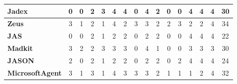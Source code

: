 \begin{table}[htb!]
\begin{tabular}{|l|l|l|l|l|l|l|l|l|l|l|l|l|l|l|l|}
\hline
\textbf{Jadex} & \multicolumn{1}{c|}{0} & \multicolumn{1}{c|}{0} & \multicolumn{1}{c|}{2} & \multicolumn{1}{c|}{3} & \multicolumn{1}{c|}{4} & \multicolumn{1}{c|}{4} & \multicolumn{1}{c|}{0} & \multicolumn{1}{c|}{4} & \multicolumn{1}{c|}{2} & \multicolumn{1}{c|}{0} & \multicolumn{1}{c|}{0} & \multicolumn{1}{c|}{4} & \multicolumn{1}{c|}{4} & \multicolumn{1}{c|}{4} & \multicolumn{1}{c|}{30} \\ 
\hline
\textbf{Zeus} & \multicolumn{1}{c|}{3} & \multicolumn{1}{c|}{1} & \multicolumn{1}{c|}{2} & \multicolumn{1}{c|}{1} & \multicolumn{1}{c|}{4} & \multicolumn{1}{c|}{2} & \multicolumn{1}{c|}{3} & \multicolumn{1}{c|}{3} & \multicolumn{1}{c|}{2} & \multicolumn{1}{c|}{2} & \multicolumn{1}{c|}{3} & \multicolumn{1}{c|}{2} & \multicolumn{1}{c|}{2} & \multicolumn{1}{c|}{4} & \multicolumn{1}{c|}{34} \\ 
\hline
\textbf{JAS} & \multicolumn{1}{c|}{0} & \multicolumn{1}{c|}{0} & \multicolumn{1}{c|}{2} & \multicolumn{1}{c|}{1} & \multicolumn{1}{c|}{2} & \multicolumn{1}{c|}{2} & \multicolumn{1}{c|}{0} & \multicolumn{1}{c|}{2} & \multicolumn{1}{c|}{2} & \multicolumn{1}{c|}{0} & \multicolumn{1}{c|}{0} & \multicolumn{1}{c|}{4} & \multicolumn{1}{c|}{4} & \multicolumn{1}{c|}{4} & \multicolumn{1}{c|}{22} \\ 
\hline
\textbf{Madkit}  & \multicolumn{1}{c|}{3} & \multicolumn{1}{c|}{2} & \multicolumn{1}{c|}{2} & \multicolumn{1}{c|}{3} & \multicolumn{1}{c|}{3} & \multicolumn{1}{c|}{3} & \multicolumn{1}{c|}{0} & \multicolumn{1}{c|}{4} & \multicolumn{1}{c|}{1} & \multicolumn{1}{c|}{0} & \multicolumn{1}{c|}{0} & \multicolumn{1}{c|}{3} & \multicolumn{1}{c|}{3} & \multicolumn{1}{c|}{3} & \multicolumn{1}{c|}{30} \\ 
\hline
\textbf{JASON} & \multicolumn{1}{c|}{2} & \multicolumn{1}{c|}{0} & \multicolumn{1}{c|}{2} & \multicolumn{1}{c|}{1} & \multicolumn{1}{c|}{2} & \multicolumn{1}{c|}{2} & \multicolumn{1}{c|}{0} & \multicolumn{1}{c|}{2} & \multicolumn{1}{c|}{2} & \multicolumn{1}{c|}{0} & \multicolumn{1}{c|}{2} & \multicolumn{1}{c|}{4} & \multicolumn{1}{c|}{4} & \multicolumn{1}{c|}{4} & \multicolumn{1}{c|}{24} \\ 
\hline
\textbf{MicrosoftAgent} & \multicolumn{1}{c|}{3} & \multicolumn{1}{c|}{1} & \multicolumn{1}{c|}{3} & \multicolumn{1}{c|}{1} & \multicolumn{1}{c|}{4} & \multicolumn{1}{c|}{3} & \multicolumn{1}{c|}{3} & \multicolumn{1}{c|}{3} & \multicolumn{1}{c|}{2} & \multicolumn{1}{c|}{1} & \multicolumn{1}{c|}{1} & \multicolumn{1}{c|}{1} & \multicolumn{1}{c|}{2} & \multicolumn{1}{c|}{4} & \multicolumn{1}{c|}{32} \\ 

\end{tabular}
\end{table}
